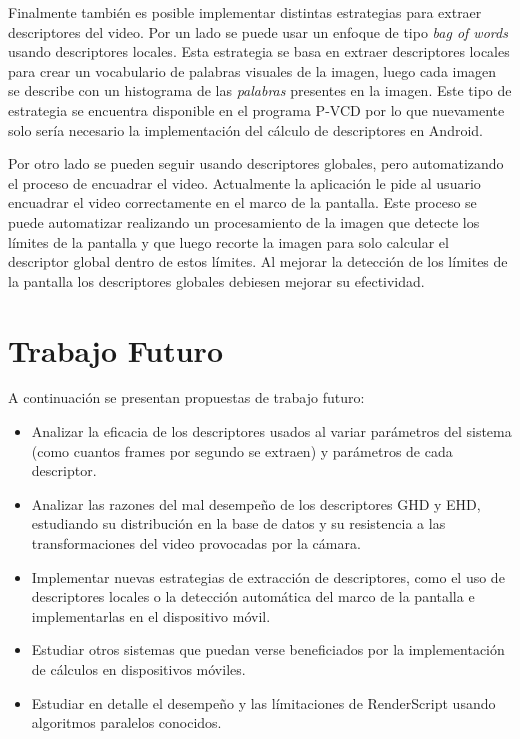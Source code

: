 Finalmente también es posible implementar distintas estrategias para extraer descriptores del video. Por un lado se puede usar un enfoque de tipo \emph{bag of words} usando descriptores locales. Esta estrategia se basa en extraer descriptores locales para crear un vocabulario de palabras visuales de la imagen, luego cada imagen se describe con un histograma de las \emph{palabras} presentes en la imagen. Este tipo de estrategia se encuentra disponible en el programa P-VCD por lo que nuevamente solo sería necesario la implementación del cálculo de descriptores en Android.

Por otro lado se pueden seguir usando descriptores globales, pero automatizando el proceso de encuadrar el video. Actualmente la aplicación le pide al usuario encuadrar el video correctamente en el marco de la pantalla. Este proceso se puede automatizar realizando un procesamiento de la imagen que detecte los límites de la pantalla y que luego recorte la imagen para solo calcular el descriptor global dentro de estos límites. Al mejorar la detección de los límites de la pantalla los descriptores globales debiesen mejorar su efectividad.

\section{Trabajo Futuro}\label{futuro}

A continuación se presentan propuestas de trabajo futuro:

\begin{itemize}
\item Analizar la eficacia de los descriptores usados al variar parámetros del sistema (como cuantos frames por segundo se extraen) y parámetros de cada descriptor.
\item Analizar las razones del mal desempeño de los descriptores GHD y EHD, estudiando su distribución en la base de datos y su resistencia a las transformaciones del video provocadas por la cámara.
\item Implementar nuevas estrategias de extracción de descriptores, como el uso de descriptores locales o la detección automática del marco de la pantalla e implementarlas en el dispositivo móvil.
\item Estudiar otros sistemas que puedan verse beneficiados por la implementación de cálculos en dispositivos móviles.
\item Estudiar en detalle el desempeño y las límitaciones de RenderScript usando algoritmos paralelos conocidos.
\end{itemize}

